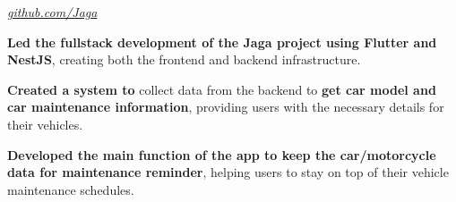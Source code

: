 \documentclass[../main.tex]{subfiles}
\begin{document}
\vspace{0.2 cm}

\begin{twocolentry}{
		\small

		\textit{\href{https://github.com/cattyman919/Jaga}{github.com/Jaga}}}
\end{twocolentry}

\vspace{0.10 cm}
\begin{onecolentry}
	\begin{highlights}
		\item \textbf{Led the fullstack development of the Jaga project using Flutter and NestJS}, creating both the frontend and backend infrastructure.
		\item \textbf{Created a system to} collect data from the backend to \textbf{get car model and car maintenance information}, providing users with the necessary details for their vehicles.
		\item \textbf{Developed the main function of the app to keep the car/motorcycle data for maintenance reminder}, helping users to stay on top of their vehicle maintenance schedules.
	\end{highlights}
\end{onecolentry}
\end{document}

